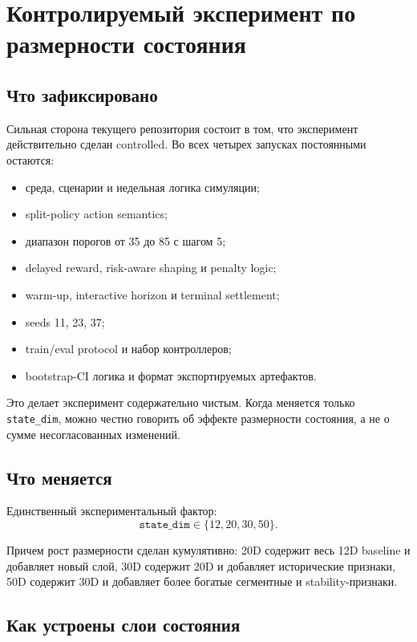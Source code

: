 \documentclass[12pt,a4paper]{article}
\begin{document}
\section{Контролируемый эксперимент по размерности состояния}

\subsection{Что зафиксировано}

Сильная сторона текущего репозитория состоит в том, что эксперимент действительно сделан controlled. Во всех четырех запусках постоянными остаются:
\begin{itemize}[leftmargin=*]
    \item среда, сценарии и недельная логика симуляции;
    \item split-policy action semantics;
    \item диапазон порогов от 35 до 85 с шагом 5;
    \item delayed reward, risk-aware shaping и penalty logic;
    \item warm-up, interactive horizon и terminal settlement;
    \item seeds 11, 23, 37;
    \item train/eval protocol и набор контроллеров;
    \item bootstrap-CI логика и формат экспортируемых артефактов.
\end{itemize}

Это делает эксперимент содержательно чистым. Когда меняется только \texttt{state\_dim}, можно честно говорить об эффекте размерности состояния, а не о сумме несогласованных изменений.

\subsection{Что меняется}

Единственный экспериментальный фактор:
\[
    \texttt{state\_dim} \in \{12, 20, 30, 50\}.
\]

Причем рост размерности сделан кумулятивно: 20D содержит весь 12D baseline и добавляет новый слой, 30D содержит 20D и добавляет исторические признаки, 50D содержит 30D и добавляет более богатые сегментные и stability-признаки.

\subsection{Как устроены слои состояния}
\end{document}
